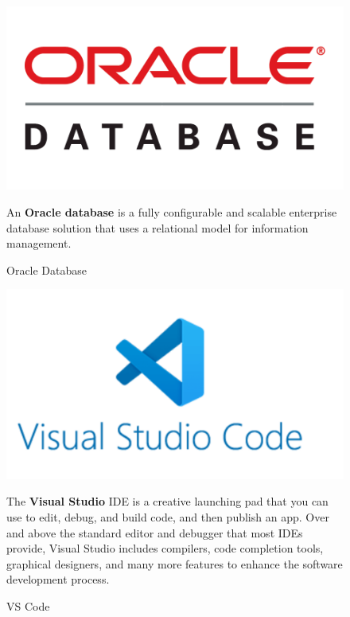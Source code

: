 \begin{figure}[h]
\centering
\begin{minipage}{0.3\textwidth}
    \centering
    \includegraphics[width=\linewidth,frame]{figures/oracle database.png}
    \caption{Oracle Database}
\end{minipage}
\hfill
\begin{minipage}{0.6\textwidth}
  An \textbf{Oracle database} is a fully configurable and scalable enterprise database solution that uses a relational model for information management.\cite{samplewebs14}
\end{minipage}
\end{figure}

\begin{figure}[h]
\centering
\begin{minipage}{0.3\textwidth}
    \centering
    \includegraphics[width=\linewidth,frame]{figures/vs code.png}
    \caption{VS Code}
\end{minipage}
\hfill
\begin{minipage}{0.6\textwidth}
  The \textbf{Visual Studio} IDE is a creative launching pad that you can use to edit, debug, and build code, and then publish an app. Over and above the standard editor and debugger that most IDEs provide, Visual Studio includes compilers, code completion tools, graphical designers, and many more features to enhance the software development process.\cite{samplewebs15}
\end{minipage}
\end{figure}

